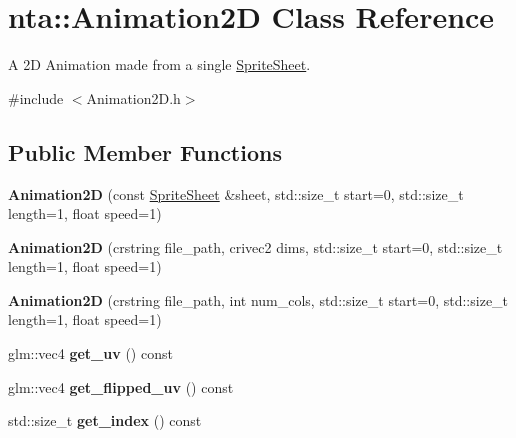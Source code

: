 \hypertarget{classnta_1_1Animation2D}{}\section{nta\+:\+:Animation2D Class Reference}
\label{classnta_1_1Animation2D}


A 2D Animation made from a single \hyperlink{structnta_1_1SpriteSheet}{Sprite\+Sheet}.  




{\ttfamily \#include $<$Animation2\+D.\+h$>$}

\subsection*{Public Member Functions}
\begin{DoxyCompactItemize}
\item 
\mbox{\label{classnta_1_1Animation2D_a792bd9b44d471dc526e89dc9b2b4b7e0}} 
{\bfseries Animation2D} (const \hyperlink{structnta_1_1SpriteSheet}{Sprite\+Sheet} \&sheet, std\+::size\+\_\+t start=0, std\+::size\+\_\+t length=1, float speed=1)
\item 
\mbox{\label{classnta_1_1Animation2D_a914bde6d79c34f2da580c9de07460e51}} 
{\bfseries Animation2D} (crstring file\+\_\+path, crivec2 dims, std\+::size\+\_\+t start=0, std\+::size\+\_\+t length=1, float speed=1)
\item 
\mbox{\label{classnta_1_1Animation2D_af7e829c4535ff57a41cfecbb9313ef7b}} 
{\bfseries Animation2D} (crstring file\+\_\+path, int num\+\_\+cols, std\+::size\+\_\+t start=0, std\+::size\+\_\+t length=1, float speed=1)
\item 
\mbox{\label{classnta_1_1Animation2D_af7373ff1020b685bd583ae63ba24de55}} 
glm\+::vec4 {\bfseries get\+\_\+uv} () const
\item 
\mbox{\label{classnta_1_1Animation2D_aa46a6c17839ad28c1f6b4c04537b237a}} 
glm\+::vec4 {\bfseries get\+\_\+flipped\+\_\+uv} () const
\item 
\mbox{\label{classnta_1_1Animation2D_ac446522438b03f14a532907ba5c3d5af}} 
std\+::size\+\_\+t {\bfseries get\+\_\+index} () const

\end{DoxyCompactItemize}
